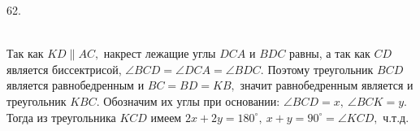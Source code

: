 62. \begin{figure}[ht!]
\end{figure}\\
Так как $KD\parallel AC,$ накрест лежащие углы $DCA$ и $BDC$ равны, а так как $CD$ является биссектрисой, $\angle BCD=\angle DCA=\angle BDC.$ Поэтому треугольник $BCD$ является равнобедренным и $BC=BD=KB,$ значит равнобедренным является и треугольник $KBC.$ Обозначим их углы при основании: $\angle BCD=x,\ \angle BCK=y.$ Тогда из треугольника $KCD$ имеем $2x+2y=180^\circ,\ x+y=90^\circ=\angle KCD,$ ч.т.д.\newpage\noindent
